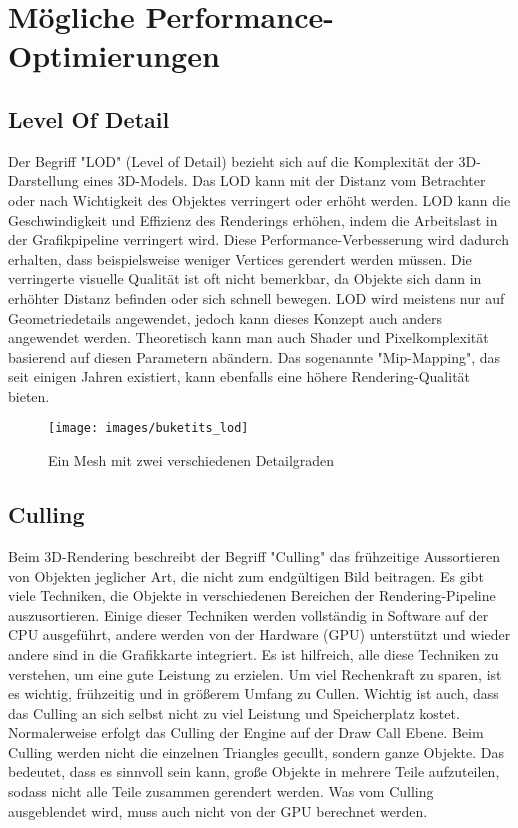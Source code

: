 \chapter{Mögliche Performance-Optimierungen} \label{simon_performance}
\section{Level Of Detail}
Der Begriff "LOD" (Level of Detail) bezieht sich auf die Komplexität der 3D-Darstellung eines 3D-Models. Das LOD kann mit der Distanz vom Betrachter oder nach Wichtigkeit des Objektes verringert oder erhöht werden. LOD kann die Geschwindigkeit und Effizienz des Renderings erhöhen, indem die Arbeitslast in der Grafikpipeline verringert wird. Diese Performance-Verbesserung wird dadurch erhalten, dass beispielsweise weniger Vertices gerendert werden müssen. Die verringerte visuelle Qualität ist oft nicht bemerkbar, da Objekte sich dann in erhöhter Distanz befinden oder sich schnell bewegen. LOD wird meistens nur auf Geometriedetails angewendet, jedoch kann dieses Konzept auch anders angewendet werden. Theoretisch kann man auch Shader und Pixelkomplexität basierend auf diesen Parametern abändern. Das sogenannte "Mip-Mapping", das seit einigen Jahren existiert, kann ebenfalls eine höhere Rendering-Qualität bieten.
\cite{_lod_formeshes}

\begin{figure}[H]
	\centering
	\texttt{[image: images/buketits\_lod]}
	\caption{Ein Mesh mit zwei verschiedenen Detailgraden\cite{_lod_formeshes}}
\end{figure}


\section{Culling}
Beim 3D-Rendering beschreibt der Begriff "Culling" das frühzeitige Aussortieren von Objekten jeglicher Art, die nicht zum endgültigen Bild beitragen. Es gibt viele Techniken, die Objekte in verschiedenen Bereichen der Rendering-Pipeline auszusortieren. Einige dieser Techniken werden vollständig in Software auf der CPU ausgeführt, andere werden von der Hardware (GPU) unterstützt und wieder andere sind in die Grafikkarte integriert. Es ist hilfreich, alle diese Techniken zu verstehen, um eine gute Leistung zu erzielen. Um viel Rechenkraft zu sparen, ist es wichtig, frühzeitig und in größerem Umfang zu Cullen. Wichtig ist auch, dass das Culling an sich selbst nicht zu viel Leistung und Speicherplatz kostet.
\cite{_cryengine_culling}
Normalerweise erfolgt das Culling der Engine auf der Draw Call Ebene. Beim Culling werden nicht die einzelnen Triangles gecullt, sondern ganze Objekte. Das bedeutet, dass es sinnvoll sein kann, große Objekte in mehrere Teile aufzuteilen, sodass nicht alle Teile zusammen gerendert werden.\cite{_cryengine_culling}
Was vom Culling ausgeblendet wird, muss auch nicht von der GPU berechnet werden.
\cite{_cryengine_culling}

